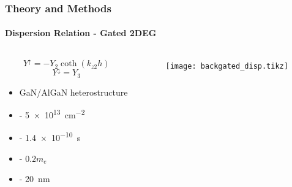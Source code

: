 \documentclass[mathserif,16pt,xcolor=table]{beamer}
\begin{document}
      \begin{frame}
        \frametitle{Theory and Methods}
        \framesubtitle{Dispersion Relation - Gated 2DEG}
        \begin{columns}[T] %
          \begin{column}{.5\textwidth}
            \begin{equation} \nonumber
              Y^{\uparrow} = - Y_{2} \coth (k_{z2} h)
            \end{equation}
            \begin{equation} \nonumber
              Y^{\downarrow} = Y_{3}
            \end{equation}
            \begin{itemize}
              \item[] GaN/AlGaN heterostructure
              \item[] { - \SI{5e13}{\cm^{-2}}}
              \item[] {\makebox[.3cm][l]{$\tau$} - \SI{1.4e-10}{\s}}
              \item[] { - $0.2 m_e$}
              \item[] { - \SI{20}{\nm}}
            \end{itemize}
          \end{column}
          \begin{column}[T]{.45\textwidth}
            \vspace*{-1cm}
            \begin{figure}
              \centering
              \fontsize{6}{7}\selectfont
              \def\svgwidth{1.\linewidth}
              
            \end{figure}
            \begin{figure} \vspace*{-.5cm} \centering
              \texttt{[image: backgated\_disp.tikz]}
              \label{fig:cond_2deg}
            \end{figure}
          \end{column}
        \end{columns}
      \end{frame}
\end{document}
